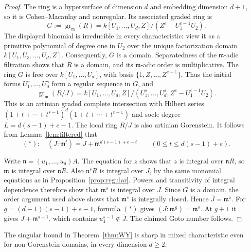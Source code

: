 \documentclass[11pt,a4paper]{amsart}
\numberwithin{equation}{section}
\newcommand{\m}{\mathfrak m}
\newcommand{\n}{\mathfrak n}
\newcommand{\ol}[1]{\overline{#1}}
\newcommand{\gr}{\operatorname{gr}}
\begin{document}
 \begin{proof}
 	The ring is a hypersurface of dimension $d$ and embedding
 	dimension $d+1$, so it is Cohen--Macaulay and nonregular.
 	Its associated graded ring is
 	$$
 	G:=\gr_\m (R)
 	=k[U_1,\ldots,U_d,Z]/(Z^e-U_1^{e-1}U_2).
 	$$
 	The displayed binomial is irreducible in every characteristic:
 	view it as a primitive polynomial of degree one in $U_2$
 	over the unique factorization domain
 	$k[U_1,U_3,\ldots,U_d,Z]$.
 	Consequently, $G$ is a domain.  Separatedness of the
 	$\m$-adic filtration shows that $R$ is a domain, and its
 	$\m$-adic order is multiplicative.
 	The ring $G$ is free over $k[U_1,\ldots,U_d]$, with basis
 	$\{1,Z,\ldots,Z^{e-1}\}$.  Thus the initial forms
 	$U_1^s,\ldots,U_d^s$ form a regular sequence in $G$, and
 $$\gr_\m(R/J)
 	=k[U_1,\ldots,U_d,Z]/
 	(U_1^s,\ldots,U_d^s,Z^e-U_1^{e-1}U_2).	$$
 	This is an artinian graded complete intersection with Hilbert
 	series
 	$ (1+t+\cdots+t^{s-1})^d
 	(1+t+\cdots+t^{e-1}) $
 	and socle degree $L=d(s-1)+e-1$.
 	The local ring $R/J$ is also artinian Gorenstein.
 	It follows from Lemma~\ref{lem:filtered} that
 	$$(\ast):\quad
 ( J:\m^t)=J+\m^{d(s-1)+e-t}
 	\qquad(0\leq t\leq d(s-1)+e).
 	$$
 	
 	Write $\n=(u_1,\ldots,u_d)A$.  The equation for $z$ shows
 	that $z$ is integral over $\n R$, so $\m$ is integral over
 	$\n R$.  Also $\n^sR$ is integral over $J$, by the same
 	monomial equations as in Proposition~\ref{prop:regular}.
 	Powers and transitivity of integral dependence therefore
 	show that $\m^s$ is integral over $J$.
 	Since $G$ is a domain, the order argument used above shows
 	that $\m^s$ is integrally closed.  Hence $\ol J=\m^s$.
 	For $g=(d-1)(s-1)+e-1$, formula $(\ast)$ gives
 	$( J:\m^g)=\m^s$.  At $g+1$ it gives $J+\m^{s-1}$,
 	which contains $u_1^{s-1}\notin\ol J$.
 	The claimed Goto number follows.
 \end{proof}
 
 
 The singular bound in Theorem~\ref{thm:WY} is sharp in
 mixed characteristic even for non-Gorenstein domains,
 in every dimension $d\geq2$:
 
\end{document}
